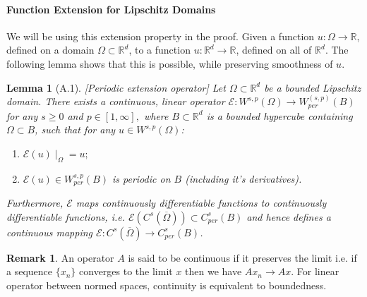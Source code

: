 \documentclass[reqno]{amsart}
\theoremstyle{plain}
\newtheorem{lem}{Lemma}
\theoremstyle{definition}
\newtheorem{rem}{Remark}
\newcommand{\bb}[1]{\mathbb{#1}}
\newcommand{\cal}[1]{\mathcal{#1}}
\begin{document}
\paragraph{\bf Function Extension for Lipschitz Domains}
We will be using this extension property in the proof. Given a function $u : \Omega \to \bb R$, defined on a domain $\Omega \subset \bb R^d$, to a function $u :\bb R^d \to \bb R$, defined on all of $\bb R^d$. The following lemma shows that this is possible, while preserving smoothness of $u$.
\begin{lem}[A.1][Periodic extension operator]
    Let $\Omega \subset \bb R^d$ be a bounded Lipschitz domain. There exists a continuous, linear operator $\cal E : W^{s,p}(\Omega) \to W_{per}^(s,p)(B)$ for any $s \geq 0$ and $p \in [1,\infty],$ where $B \subset \bb R^d$ is a bounded hypercube containing $\Omega \subset B$, such that for any $u \in W^{s,p}(\Omega)$:
    \begin{enumerate}
        \item $\cal E(u)\mid_\Omega = u;$
        \item $\cal E(u) \in W^{s,p}_{per}(B)$ is periodic on $B$ (including it's derivatives).
    \end{enumerate}
    Furthermore, $\cal E$ maps continuously differentiable functions to continuously differentiable functions, i.e. $\cal E(C^s(\overline{\Omega})) \subset C^s_{per}(B)$ and hence defines a continuous mapping $\cal E: C^s(\overline{\Omega}) \to C^s_{per}(B)$.
\end{lem}
\begin{rem}
    An operator $A$ is said to be continuous if it preserves the limit i.e. if a sequence $\{x_n\}$ converges to the limit $x$ then we have $Ax_n \to Ax$. For linear operator between normed spaces, continuity is equivalent to boundedness.
\end{rem}
\end{document}
